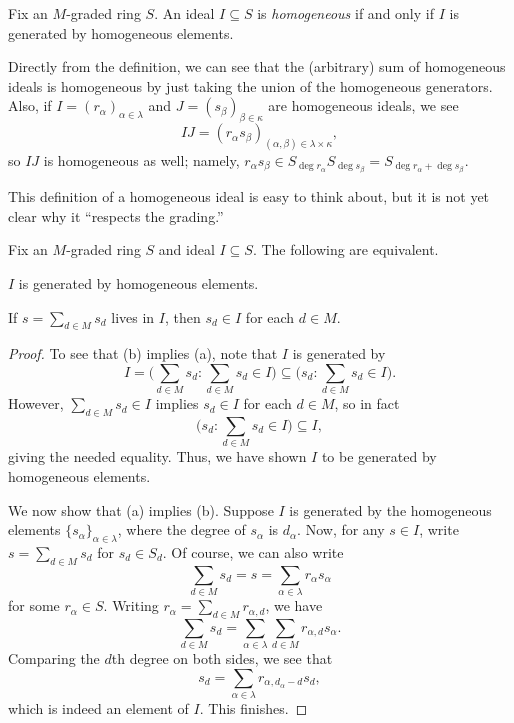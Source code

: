 \documentclass[../notes.tex]{subfiles}
\begin{document}
\begin{definition}
	Fix an $M$-graded ring $S$. An ideal $I\subseteq S$ is \textit{homogeneous} if and only if $I$ is generated by homogeneous elements.
\end{definition}
\begin{remark} \label{rem:sumprodhomoideal}
	Directly from the definition, we can see that the (arbitrary) sum of homogeneous ideals is homogeneous by just taking the union of the homogeneous generators. Also, if $I=(r_\alpha)_{\alpha\in\lambda}$ and $J=(s_\beta)_{\beta\in\kappa}$ are homogeneous ideals, we see
	\[IJ=(r_\alpha s_\beta)_{(\alpha,\beta)\in\lambda\times\kappa},\]
	so $IJ$ is homogeneous as well; namely, $r_\alpha s_\beta\in S_{\deg r_\alpha}S_{\deg s_\beta}=S_{\deg r_\alpha+\deg s_\beta}$.
\end{remark}
This definition of a homogeneous ideal is easy to think about, but it is not yet clear why it ``respects the grading.''
\begin{lemma} \label{lem:betterhomogeneousideal}
	Fix an $M$-graded ring $S$ and ideal $I\subseteq S$. The following are equivalent.
	\begin{listalph}
		\item $I$ is generated by homogeneous elements.
		\item If $s=\sum_{d\in M}s_d$ lives in $I$, then $s_d\in I$ for each $d\in M$.
	\end{listalph}
\end{lemma}
\begin{proof}
	To see that (b) implies (a), note that $I$ is generated by
	\[I=\Bigg(\sum_{d\in M}s_d:\sum_{d\in M}s_d\in I\Bigg)\subseteq\Bigg(s_d:\sum_{d\in M}s_d\in I\Bigg).\]
	However, $\sum_{d\in M}s_d\in I$ implies $s_d\in I$ for each $d\in M$, so in fact
	\[\Bigg(s_d:\sum_{d\in M}s_d\in I\Bigg)\subseteq I,\]
	giving the needed equality. Thus, we have shown $I$ to be generated by homogeneous elements.

	We now show that (a) implies (b). Suppose $I$ is generated by the homogeneous elements $\{s_\alpha\}_{\alpha\in\lambda}$, where the degree of $s_\alpha$ is $d_\alpha$. Now, for any $s\in I$, write $s=\sum_{d\in M}s_d$ for $s_d\in S_d$. Of course, we can also write
	\[\sum_{d\in M}s_d=s=\sum_{\alpha\in\lambda}r_\alpha s_\alpha\]
	for some $r_\alpha\in S$. Writing $r_\alpha=\sum_{d\in M}r_{\alpha,d}$, we have
	\[\sum_{d\in M}s_d=\sum_{\alpha\in\lambda}\sum_{d\in M}r_{\alpha,d}s_\alpha.\]
	Comparing the $d$th degree on both sides, we see that
	\[s_d=\sum_{\alpha\in\lambda}r_{\alpha,d_\alpha-d}s_d,\]
	which is indeed an element of $I$. This finishes.
\end{proof}
\end{document}
